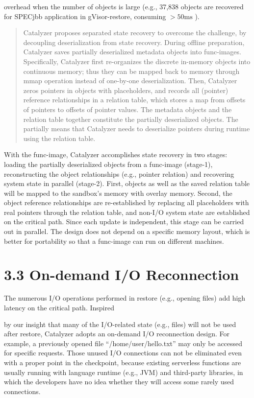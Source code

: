 \documentclass[
  10
]{article}
\begin{document}
overhead when the number of objects is large (e.g., 37,838 objects are
recovered for SPECjbb application in gVisor-restore, consuming
\(> 5 0 \mathrm { m s }\) ).

\begin{quote}
Catalyzer proposes separated state recovery to overcome the challenge,
by decoupling deserialization from state recovery. During offline
preparation, Catalyzer saves partially deserialized metadata objects
into func-images. Specifically, Catalyzer first re-organizes the
discrete in-memory objects into continuous memory; thus they can be
mapped back to memory through mmap operation instead of one-by-one
deserialization. Then, Catalyzer zeros pointers in objects with
placeholders, and records all (pointer) reference relationships in a
relation table, which stores a map from offsets of pointers to offsets
of pointer values. The metadata objects and the relation table together
constitute the partially deserialized objects. The partially means that
Catalyzer needs to deserialize pointers during runtime using the
relation table.
\end{quote}

With the func-image, Catalyzer accomplishes state recovery in two
stages: loading the partially deserialized objects from a func-image
(stage-1), reconstructing the object relationships (e.g., pointer
relation) and recovering system state in parallel (stage-2). First,
objects as well as the saved relation table will be mapped to the
sandbox's memory with overlay memory. Second, the object reference
relationships are re-established by replacing all placeholders with real
pointers through the relation table, and non-I/O system state are
established on the critical path. Since each update is independent, this
stage can be carried out in parallel. The design does not depend on a
specific memory layout, which is better for portability so that a
func-image can run on different machines.

\section{3.3 On-demand I/O
Reconnection}\label{on-demand-io-reconnection}

The numerous I/O operations performed in restore (e.g., opening files)
add high latency on the critical path. Inspired

by our insight that many of the I/O-related state (e.g., files) will not
be used after restore, Catalyzer adopts an on-demand I/O reconnection
design. For example, a previously opened file ``/home/user/hello.txt''
may only be accessed for specific requests. Those unused I/O connections
can not be eliminated even with a proper point in the checkpoint,
because existing serverless functions are usually running with language
runtime (e.g., JVM) and third-party libraries, in which the developers
have no idea whether they will access some rarely used connections.
\end{document}

